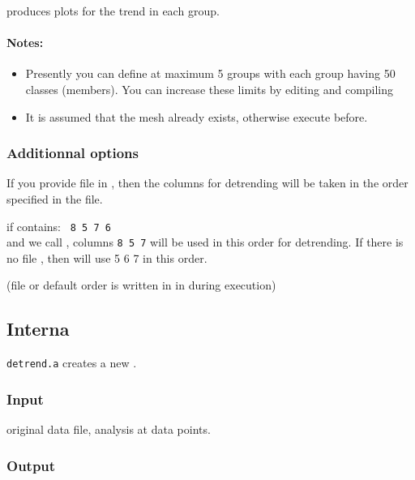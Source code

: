  produces plots for the trend in each group.


\paragraph{Notes:} 
\begin{itemize}
\item Presently you can define at maximum 5 groups with each group having 50 classes (members). You can increase these limits by editing and compiling 
\item It is assumed that the mesh already exists, otherwise execute  before.
\end{itemize}

\subsubsection{Additionnal options}

If you provide file  in , then the columns for detrending will be taken in the order 
specified in the file. 

\example if  contains:
\texttt{
8 5 7 6
}\\
and we call , columns \texttt{8 5 7} will be used in this order for detrending. If there is no file , then  will use 5 6 7 in this order.

(file  or default order is written in  in  during execution)




\subsection{Interna}	%

\texttt{detrend.a} creates a new .  

\subsubsection{Input}

 original data file,  analysis at data points. 
 
\subsubsection{Output}

